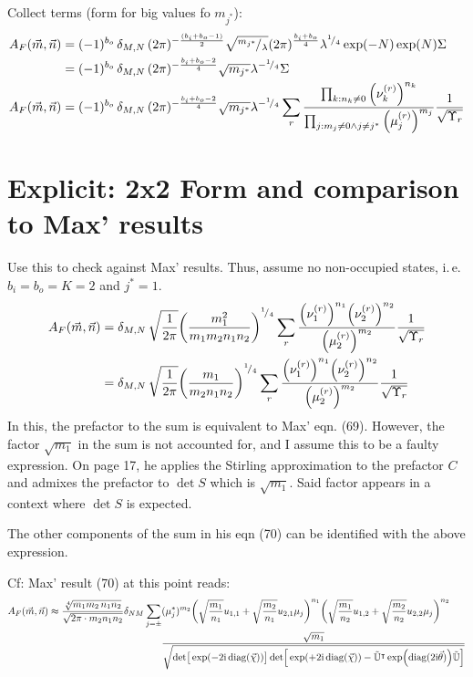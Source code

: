 \documentclass[
	english,
	a4paper,
	fontsize=10pt,
	parskip=half,
	titlepage=true,
	DIV=12,
	final
]{scrreprt}
\newcommand*{\ie}{i.\,e.\xspace}
\newcommand*{\smallfrac}  [2]{\ensuremath{{}^        {#1} \!/_        {#2}}}
\newcommand*{\transp}{\ensuremath{^\intercal}}
\newcommand*{\iunit}{\ensuremath{\mathrm{i}}}
\DeclareMathOperator{\diag}{diag}
\begin{document}
Collect terms (form for big values fo $m_{j^*}$):
\begin{align}
		A_F(\vec{m}, \vec{n})
&=
	(-1)^{b_o} \,	
	\delta_{M,N} \,
	(2\pi)^{-\frac{(b_i + b_o - 1)}{2}}
	\sqrt{\smallfrac{m_{j^*}}{\lambda}}
	(2\pi)^{\frac{b_i + b_o}{4}}
	\lambda^{\smallfrac{1}{4}}
	\exp(-N)
	\exp(N)
	\Sigma \\
&=
	(-1)^{b_o} \,	
	\delta_{M,N} \,
	(2\pi)^{-\frac{b_i + b_o - 2}{4}}
	\sqrt{m_{j^*}}
	\lambda^{-\smallfrac{1}{4}}
	\Sigma
\\
		A_F(\vec{m}, \vec{n})
&=
	(-1)^{b_o} \,	
	\delta_{M,N} \,
	(2\pi)^{-\frac{b_i + b_o - 2}{4}}
	\sqrt{m_{j^*}}
	\lambda^{-\smallfrac{1}{4}}
	\sum_{r}	
		\frac
			{\prod_{k : n_k \neq 0}                  \qty(\nu_k^{(r)})^{n_k}}
			{\prod_{j : m_j \neq 0 \land j \neq j^*} \qty(\mu_j^{(r)})^{m_j}}
		\frac{1}{\sqrt{\Upsilon_r}}
\end{align}

\section{Explicit: 2x2 Form and comparison to Max' results}
Use this to check against Max' results. Thus, assume no non-occupied states, \ie $b_i = b_o = K = 2$ and $j^* = 1$.
\begin{align}
		A_F(\vec{m}, \vec{n})
&=
	\delta_{M,N} \,
	\sqrt{\frac{1}{2\pi}}
	\qty(
		\frac{m_1^2}{m_1 m_2 n_1 n_2}
	)^{\smallfrac{1}{4}}
	\sum_{r}	
		\frac
			{\qty(\nu_1^{(r)})^{n_1}   \qty(\nu_2^{(r)})^{n_2}}
			{\qty(\mu_2^{(r)})^{m_2}}
		\frac{1}{\sqrt{\Upsilon_r}} 
		\label{eqn:spc2x2_unshortened_own} \\
&=
	\delta_{M,N} \,
	\sqrt{\frac{1}{2\pi}}
	\qty(
		\frac{m_1}{m_2 n_1 n_2}
	)^{\smallfrac{1}{4}}
	\sum_{r}	
		\frac
			{\qty(\nu_1^{(r)})^{n_1}   \qty(\nu_2^{(r)})^{n_2}}
			{\qty(\mu_2^{(r)})^{m_2}}
		\frac{1}{\sqrt{\Upsilon_r}}
		\label{eqn:spc2x2_shortened_own} 
\end{align}
In this, the prefactor to the sum is equivalent to Max' eqn. (69). However, the factor $\sqrt{m_1}$ in the sum is not accounted for, and I assume this to be a faulty expression. On page 17, he applies the Stirling approximation to the prefactor $C$ and admixes the prefactor to $\det S$ which is $\sqrt{m_1}$. Said factor appears in a context where $\det S$ is expected.

The other components of the sum in his eqn (70) can be identified with the above expression.

Cf: Max' result (70) at this point reads:
\begin{align}
	A_F(\vec{m}, \vec{n})
\approx
	\frac
		{\sqrt[4]{m_1 m_2 \, n_1 n_2}}
		{\sqrt{2\pi \cdot m_2 n_1 n_2}}
	\delta_{NM}
	\sum_{j = \pm}
&
		(\mu_j^*)^{m_2}
		\qty(
			\sqrt{\frac{m_1}{n_1}} u_{1,1} +
			\sqrt{\frac{m_2}{n_1}} u_{2,1} \mu_j
		)^{n_1}
		\qty(
			\sqrt{\frac{m_1}{n_2}} u_{1,2} +
			\sqrt{\frac{m_2}{n_2}} u_{2,2} \mu_j
		)^{n_2}
\\ &
	\frac
		{\sqrt{m_1}}
		{\sqrt{
			\det[\big. \exp(-2\iunit \diag(\vec{\chi}))]
			\det[
				\big. \exp(+2\iunit \diag(\vec{\chi})) - 
				\tilde{\mathbb{U}}\transp \exp(\diag(2\iunit \vec{\theta})) \tilde{\mathbb{U}}
			]
		}}
\end{align}
\end{document}
